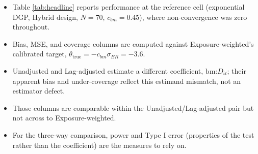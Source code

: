 \documentclass[
  11pt,
]{article}
\providecommand{\tightlist}{%
  \setlength{\itemsep}{0pt}\setlength{\parskip}{0pt}}
\begin{document}
\begin{itemize}
\tightlist
\item
  Table \ref{tab:headline} reports performance at the reference cell
  (exponential DGP, Hybrid design, \(N = 70\), \(c_{bm} = 0.45\)), where
  non-convergence was zero throughout.
\item
  Bias, MSE, and coverage columns are computed against
  Exposure-weighted's calibrated target,
  \(\theta_{\text{true}} = -c_{bm}\sigma_{BR} = -3.6\).
\item
  Unadjusted and Lag-adjusted estimate a different coefficient,
  \(\text{bm:}D_{it}\); their apparent bias and under-coverage reflect
  this estimand mismatch, not an estimator defect.
\item
  Those columns are comparable within the Unadjusted/Lag-adjusted
  pair but not across to Exposure-weighted.
\item
  For the three-way comparison, power and Type I error (properties of
  the test rather than the coefficient) are the measures to rely on.
\end{itemize}
\end{document}
